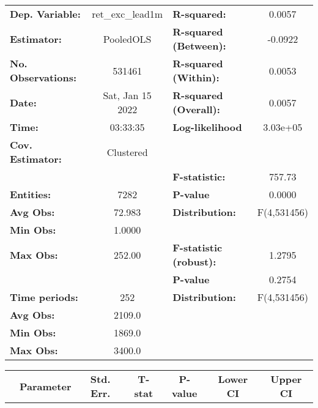 \begin{center}
\begin{tabular}{lclc}
\toprule
\textbf{Dep. Variable:}    &  ret\_exc\_lead1m  & \textbf{  R-squared:         }   &      0.0057      \\
\textbf{Estimator:}        &     PooledOLS      & \textbf{  R-squared (Between):}  &     -0.0922      \\
\textbf{No. Observations:} &       531461       & \textbf{  R-squared (Within):}   &      0.0053      \\
\textbf{Date:}             &  Sat, Jan 15 2022  & \textbf{  R-squared (Overall):}  &      0.0057      \\
\textbf{Time:}             &      03:33:35      & \textbf{  Log-likelihood     }   &     3.03e+05     \\
\textbf{Cov. Estimator:}   &     Clustered      & \textbf{                     }   &                  \\
\textbf{}                  &                    & \textbf{  F-statistic:       }   &      757.73      \\
\textbf{Entities:}         &        7282        & \textbf{  P-value            }   &      0.0000      \\
\textbf{Avg Obs:}          &       72.983       & \textbf{  Distribution:      }   &   F(4,531456)    \\
\textbf{Min Obs:}          &       1.0000       & \textbf{                     }   &                  \\
\textbf{Max Obs:}          &       252.00       & \textbf{  F-statistic (robust):} &      1.2795      \\
\textbf{}                  &                    & \textbf{  P-value            }   &      0.2754      \\
\textbf{Time periods:}     &        252         & \textbf{  Distribution:      }   &   F(4,531456)    \\
\textbf{Avg Obs:}          &       2109.0       & \textbf{                     }   &                  \\
\textbf{Min Obs:}          &       1869.0       & \textbf{                     }   &                  \\
\textbf{Max Obs:}          &       3400.0       & \textbf{                     }   &                  \\
\bottomrule
\end{tabular}
\begin{tabular}{lcccccc}
                & \textbf{Parameter} & \textbf{Std. Err.} & \textbf{T-stat} & \textbf{P-value} & \textbf{Lower CI} & \textbf{Upper CI}  \\

\end{tabular}
\end{center}
